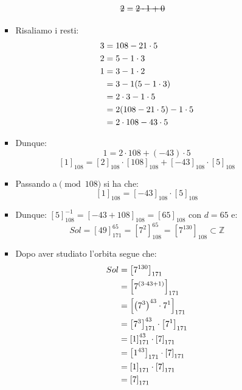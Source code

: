 \documentclass[10pt]{article}
\begin{document}
\begin{itemize}
\begin{enumerate}
\begin{itemize}
\begin{equation}
\begin{split}
		\hbox{\sout{$2$}} &= \hbox{\sout{$2 \cdot 1 + 0$}}
		\notag
		\end{split}
		\end{equation}
		\item
		Risaliamo i resti:
		\begin{equation}
		\begin{split}
		3 &= 108 - 21 \cdot 5 \\
		2 &= 5 - 1 \cdot 3 \\
		1 &= 3 - 1 \cdot 2 \\
		&= 3 - 1(5 - 1 \cdot 3) \\
		&= 2 \cdot 3 - 1 \cdot 5 \\
		&= 2(108 - 21 \cdot 5) - 1 \cdot 5 \\
		&= 2 \cdot 108 - 43 \cdot 5
		\notag				
		\end{split}
		\end{equation}
		\item
		Dunque: 
		$$1 = 2 \cdot 108 + (-43) \cdot 5$$
		$$\left[1\right]_{108} = \left[2\right]_{108} \cdot \left[108\right]_{108} + \left[-43\right]_{108} \cdot \left[5\right]_{108}$$
		\item
		Passando a$\pmod{108}$ si ha che:
		$$\left[1\right]_{108} = \left[-43\right]_{108} \cdot \left[5\right]_{108}$$
		\item
		Dunque: $\left[5\right]_{108}^{-1} = \left[-43 + 108\right]_{108} = \left[65\right]_{108}$ con $d=65$ e: $$Sol = \left[49\right]_{171}^{65} = \left[7^2\right]_{108}^{65} = \left[7^{130}\right]_{108} \subset \mathbb{Z}$$
		\item
		Dopo aver studiato l'orbita segue che:
		\begin{equation}
		\begin{split}
		Sol &=  \left[7^{130}\right]_{171} \\
		&= \left[7^{(3 \cdot 43 +1)}\right]_{171} \\
		&= \left[\left(7^3\right)^{43} \cdot 7^1\right]_{171} \\
		&= \left[7^3\right]_{171}^{43} \cdot \left[7^1\right]_{171} \\
		&= \left[1\right]_{171}^{43} \cdot \left[7\right]_{171} \\
		&= \left[1^{43}\right]_{171} \cdot \left[7\right]_{171} \\
		&= \left[1\right]_{171} \cdot \left[7\right]_{171} \\
		&= \left[7\right]_{171}
 		\notag
		\end{split}
		\end{equation}

\end{itemize}
\end{enumerate}
\end{itemize}
\end{document}
